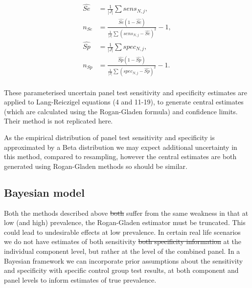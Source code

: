 \documentclass[a4paper, 12pt, twoside]{article}
\let\Oldsubsection\subsection
\renewcommand{\subsection}{\FloatBarrier\Oldsubsection}
\providecommand{\DIFaddtex}[1]{{\protect\color{blue}\uwave{#1}}} %
\providecommand{\DIFdeltex}[1]{{\protect\color{red}\sout{#1}}}                      %
\providecommand{\DIFaddbegin}{} %
\providecommand{\DIFaddend}{} %
\providecommand{\DIFdelbegin}{} %
\providecommand{\DIFdelend}{} %
\providecommand{\DIFadd}[1]{\texorpdfstring{\DIFaddtex{#1}}{#1}} %
\providecommand{\DIFdel}[1]{\texorpdfstring{\DIFdeltex{#1}}{}} %
\begin{document}
\begin{equation*}
\begin{aligned}
\widehat{Se} &= \frac{1}{|J|}\sum{sens_{N,j}},\\
n_{Se} &= \frac{
\widehat{Se}(1-\widehat{Se})
}{
\frac{1}{|J|}\sum{(sens_{N,j}-\widehat{Se})^2}
}-1,\\
\widehat{Sp} &= \frac{1}{|J|}\sum{spec_{N,j}},\\
n_{Sp} &= \frac{
\widehat{Sp}(1-\widehat{Sp})
}{
\frac{1}{|J|}\sum{(spec_{N,j}-\widehat{Sp})^2}
}-1.\\
\end{aligned}
\end{equation*}

These parameterised uncertain panel test sensitivity and specificity estimates are applied to Lang-Reiczigel equations (4 and 11-19)\cite{lang2014}, to generate central estimates (which are calculated using the Rogan-Gladen formula) and confidence limits. Their method is not replicated here.

As the empirical distribution of panel test sensitivity and specificity is approximated by a Beta distribution we may expect additional uncertainty in this method, compared to resampling, however the central estimates are both generated using Rogan-Gladen methods so should be similar.

\subsection{Bayesian model}

Both the methods described above \DIFdelbegin \DIFdel{both }\DIFdelend suffer from the same weakness in that at low (and high) prevalence, the Rogan-Gladen estimator must be truncated. This could lead to undesirable effects at low prevalence. In certain real life scenarios we do not have estimates of both sensitivity \DIFdelbegin \DIFdel{both specificity information }\DIFdelend \DIFaddbegin \DIFadd{and specificity }\DIFaddend at the individual component level, but rather at the level of the combined panel. In a Bayesian framework we can incorporate prior assumptions about the sensitivity and specificity with specific control group test results, at both component and panel levels to inform estimates of true prevalence.
\end{document}
